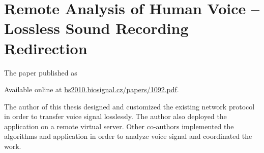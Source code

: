\chapter{Remote Analysis of Human Voice – Lossless Sound Recording Redirection}\label{app:remote}
The paper \cite{kulhanek2010b} published as
 

Available online at \href{http://bs2010.biosignal.cz/papers/1092.pdf}{bs2010.biosignal.cz/papers/1092.pdf}.

The author of this thesis designed and customized the existing network protocol in order to transfer voice signal losslessly. The author also deployed the application on a remote virtual server. Other co-authors implemented the algorithms and application in order to analyze voice signal and coordinated the work.

%